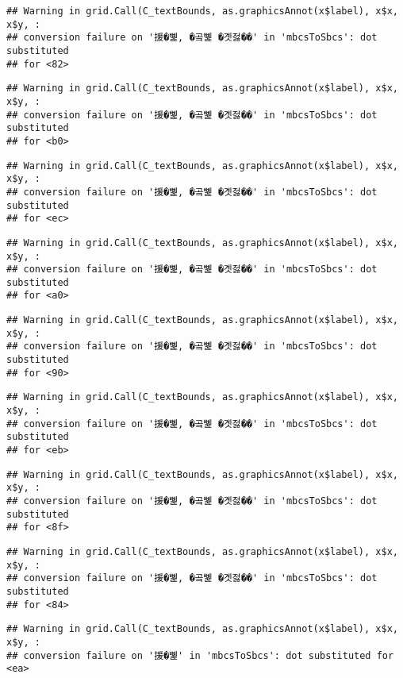 \documentclass[
]{article}
\begin{document}
\begin{verbatim}
## Warning in grid.Call(C_textBounds, as.graphicsAnnot(x$label), x$x, x$y, :
## conversion failure on '援�뼱, �곸뼱 �곗젏��' in 'mbcsToSbcs': dot substituted
## for <82>
\end{verbatim}

\begin{verbatim}
## Warning in grid.Call(C_textBounds, as.graphicsAnnot(x$label), x$x, x$y, :
## conversion failure on '援�뼱, �곸뼱 �곗젏��' in 'mbcsToSbcs': dot substituted
## for <b0>
\end{verbatim}

\begin{verbatim}
## Warning in grid.Call(C_textBounds, as.graphicsAnnot(x$label), x$x, x$y, :
## conversion failure on '援�뼱, �곸뼱 �곗젏��' in 'mbcsToSbcs': dot substituted
## for <ec>
\end{verbatim}

\begin{verbatim}
## Warning in grid.Call(C_textBounds, as.graphicsAnnot(x$label), x$x, x$y, :
## conversion failure on '援�뼱, �곸뼱 �곗젏��' in 'mbcsToSbcs': dot substituted
## for <a0>
\end{verbatim}

\begin{verbatim}
## Warning in grid.Call(C_textBounds, as.graphicsAnnot(x$label), x$x, x$y, :
## conversion failure on '援�뼱, �곸뼱 �곗젏��' in 'mbcsToSbcs': dot substituted
## for <90>
\end{verbatim}

\begin{verbatim}
## Warning in grid.Call(C_textBounds, as.graphicsAnnot(x$label), x$x, x$y, :
## conversion failure on '援�뼱, �곸뼱 �곗젏��' in 'mbcsToSbcs': dot substituted
## for <eb>
\end{verbatim}

\begin{verbatim}
## Warning in grid.Call(C_textBounds, as.graphicsAnnot(x$label), x$x, x$y, :
## conversion failure on '援�뼱, �곸뼱 �곗젏��' in 'mbcsToSbcs': dot substituted
## for <8f>
\end{verbatim}

\begin{verbatim}
## Warning in grid.Call(C_textBounds, as.graphicsAnnot(x$label), x$x, x$y, :
## conversion failure on '援�뼱, �곸뼱 �곗젏��' in 'mbcsToSbcs': dot substituted
## for <84>
\end{verbatim}

\begin{verbatim}
## Warning in grid.Call(C_textBounds, as.graphicsAnnot(x$label), x$x, x$y, :
## conversion failure on '援�뼱' in 'mbcsToSbcs': dot substituted for <ea>
\end{verbatim}
\end{document}
